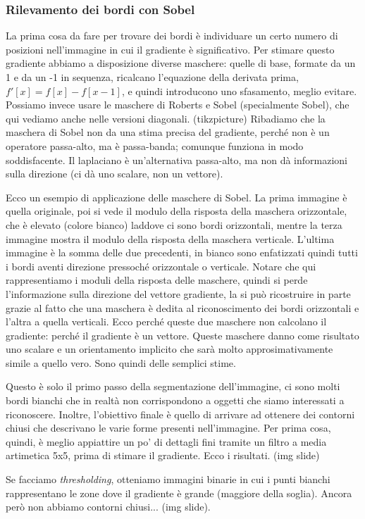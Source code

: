 \documentclass[a4paper,11pt]{article}
\begin{document}
\subsubsection{Rilevamento dei bordi con Sobel}
La prima cosa da fare per trovare dei bordi è individuare un certo numero di posizioni nell'immagine in cui il gradiente è significativo.
Per stimare questo gradiente abbiamo a disposizione diverse maschere: quelle di base, formate da un 1 e da un -1 in sequenza, ricalcano
l'equazione della derivata prima, $f'[x] = f[x] - f[x-1]$, e quindi introducono uno sfasamento, meglio evitare. Possiamo invece usare
le maschere di Roberts e Sobel (specialmente Sobel), che qui vediamo anche nelle versioni diagonali. (tikzpicture)
Ribadiamo che la maschera di Sobel non da una stima precisa del gradiente, perché non è un operatore passa-alto, ma è passa-banda; comunque
funziona in modo soddisfacente. Il laplaciano è un'alternativa passa-alto, ma non dà informazioni sulla direzione (ci dà uno scalare, non un vettore).
\par
Ecco un esempio di applicazione delle maschere di Sobel. La prima immagine è quella originale, poi si vede il modulo della risposta della maschera orizzontale,
che è elevato (colore bianco) laddove ci sono bordi orizzontali, mentre la terza immagine mostra il modulo della risposta della maschera verticale.
L'ultima immagine è la somma delle due precedenti, in bianco sono enfatizzati quindi tutti i bordi aventi direzione pressoché orizzontale o verticale.
Notare che qui rappresentiamo i moduli della risposta delle maschere, quindi si perde l'informazione sulla direzione del vettore gradiente,
la si può ricostruire in parte grazie al fatto che una maschera è dedita al riconoscimento dei bordi orizzontali e l'altra a quella verticali.
Ecco perché queste due maschere non calcolano il gradiente: perché il gradiente è un vettore. Queste maschere danno come risultato uno scalare e un orientamento implicito
che sarà molto approsimativamente simile a quello vero. Sono quindi delle semplici stime.
\par
Questo è solo il primo passo della segmentazione dell'immagine, ci sono molti bordi bianchi che in realtà non corrispondono a oggetti che siamo
interessati a riconoscere. Inoltre, l'obiettivo finale è quello di arrivare ad ottenere dei contorni chiusi che descrivano le varie forme
presenti nell'immagine.
Per prima cosa, quindi, è meglio appiattire un po' di dettagli fini tramite un filtro a media artimetica 5x5, prima di stimare il gradiente.
Ecco i risultati. (img slide)
\par
Se facciamo \textit{thresholding}, otteniamo immagini binarie in cui i punti bianchi rappresentano le zone dove il gradiente è grande (maggiore della soglia).
Ancora però non abbiamo contorni chiusi... (img slide).
\end{document}

